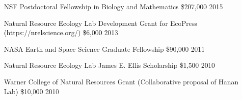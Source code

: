 


\begin{cvhonors}

  \cvhonor
    {NSF Postdoctoral Fellowship in Biology and Mathematics} %
    {\$207,000} %
    {\phantom} %
    {2015} %

  \cvhonor
    {Natural Resource Ecology Lab Development Grant for EcoPress (https://nrelscience.org/)} %
    {\$6,000} %
    {\phantom} %
    {2013} %

 \cvhonor
    {NASA Earth and Space Science Graduate Fellowship} %
    {\$90,000} %
    {\phantom} %
    {2011} %

 \cvhonor
    {Natural Resource Ecology Lab James E. Ellis Scholarship} %
    {\$1,500} %
    {\phantom} %
    {2010} %

 \cvhonor
    {Warner College of Natural Resources Grant (Collaborative proposal of Hanan Lab)} %
    {\$10,000} %
    {\phantom} %
    {2010} %

\end{cvhonors}



